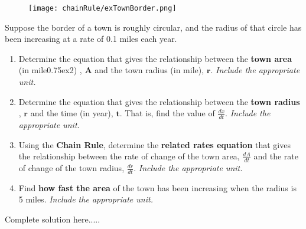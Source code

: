 \begin{figure}
\texttt{[image: chainRule/exTownBorder.png]}
\end{figure}
\hfill \break
\vspace{-0.5in}
\begin{example}
Suppose the border of a town is roughly circular, and the radius of that circle has been increasing at a rate of 0.1 miles each year. 
\renewcommand{\labelenumi}{\textbf{(\alph{enumi})}}
\begin{enumerate}[leftmargin=*]
    \item Determine the equation that gives the relationship between the \textbf{town area} (in mile\raise0.75ex\hbox{\scriptsize{2}}) , $\bm{A}$ and the town radius (in mile), $\bm{r}$. \emph{Include the appropriate unit.} 
\end{enumerate}

\renewcommand{\labelenumi}{\textbf{(\alph{enumi})}}
\begin{enumerate}[leftmargin=*]
    \setcounter{enumi}{1}
    \item Determine the equation that gives the relationship between the \textbf{town radius} , $\bm{r}$ and the time (in year), $\bm{t}$. That is, find the value of $\frac{dx}{dt}$. \emph{Include the appropriate unit.}
    \item Using the \textbf{Chain Rule}, determine the \textbf{related rates equation} that gives the relationship between the rate of change of the town area, $\displaystyle\frac{dA}{dt}$ and the rate of change of the town radius, $\displaystyle\frac{dr}{dt}$. \emph{Include the appropriate unit.}
    \item Find \textbf{how fast the area} of the town has been increasing when the radius is 5 miles. \emph{Include the appropriate unit.} 
    
\end{enumerate}
    \begin{sol}
    \end{sol}
    \begin{solL}
    Complete solution here.....
    
    \end{solL}
    
\end{example}

